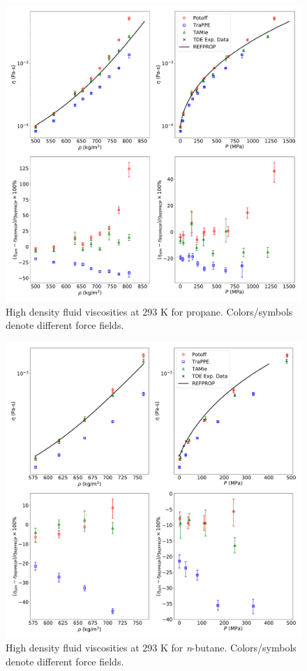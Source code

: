 \documentclass[preprint,review,12pt]{elsarticle}
\begin{document}
	\begin{figure}[p!]
		\centering
		\includegraphics[width=6.4in]{compare_REFPROP_T293highP_C3H8_Pas.pdf}
		\caption{High density fluid viscosities at 293 K for propane. Colors/symbols denote different force fields.}
		\label{fig:T293highP_C3}
	\end{figure} 
	
	\begin{figure}[p!]
		\centering
		\includegraphics[width=6.4in]{compare_REFPROP_T293highP_C4H10_Pas_new_REFPROP.pdf}
		\caption{High density fluid viscosities at 293 K for \textit{n}-butane. Colors/symbols denote different force fields.}
		\label{fig:T293highP_C4}
	\end{figure} 
	
\end{document}
